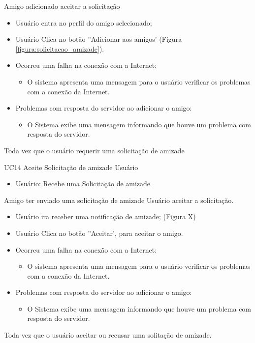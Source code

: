 {Amigo adicionado aceitar a solicitação}
{
\begin{itemize}
		\item Usuário entra no perfil do amigo selecionado;
		\item Usuário Clica no botão ''Adicionar aos amigos' (Figura 			 	\ref{figura:solicitacao_amizade}).	
\end{itemize}
}
{
\begin{itemize}
	\item Ocorreu uma falha na conexão com a Internet:
	\begin{itemize}
		\item O sistema apresenta uma mensagem para o usuário verificar os problemas com a conexão da Internet.
	\end{itemize}
	
	\item Problemas com resposta do servidor ao adicionar o amigo:
	\begin{itemize}
	\item O Sistema exibe uma mensagem informando que houve um problema com resposta do servidor.
	\end{itemize}

\end{itemize}
}
{Toda vez que o usuário requerir uma solicitação de amizade}
{
 
}
\casoDeUso
{UC14}
{Aceite Solicitação de amizade}
{Usuário}
{
\begin{itemize}
	\item Usuário: Recebe uma Solicitação de amizade
\end{itemize}

}
{Amigo ter enviado uma solicitação de amizade}
{Usuário aceitar a solicitação.}
{
\begin{itemize}
		\item Usuário ira receber uma notificação de amizade; (Figura X)
		\item Usuário Clica no botão ''Aceitar', para aceitar o amigo.
\end{itemize}
}
{
\begin{itemize}
	\item Ocorreu uma falha na conexão com a Internet:
	\begin{itemize}
		\item O sistema apresenta uma mensagem para o usuário verificar os problemas com a conexão da Internet.
	\end{itemize}
	
	\item Problemas com resposta do servidor ao adicionar o amigo:
	\begin{itemize}
	\item O Sistema exibe uma mensagem informando que houve um problema com resposta do servidor.
	\end{itemize}

\end{itemize}
}
{Toda vez que o usuário aceitar ou recusar uma solitação de amizade.}
{
 
}

